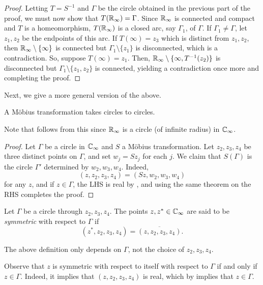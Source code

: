 \begin{proof}
		Letting $T = S^{-1}$ and $\Gamma$ be the circle obtained in the previous part of the proof, we must now show that $T(\mathbb{R}_\infty) = \Gamma$. Since $\mathbb{R}_\infty$ is connected and compact and $T$ is a homeomorphism, $T(\mathbb{R}_\infty)$ is a closed arc, say $\Gamma_1$, of $\Gamma$. If $\Gamma_1 \ne \Gamma$, let $z_1,z_2$ be the endpoints of this arc. If $T(\infty) = z_3$ which is distinct from $z_1,z_2$, then $\mathbb{R}_\infty \setminus \{\infty\}$ is connected but $\Gamma_1 \setminus \{z_1\}$ is disconnected, which is a contradiction. So, suppose $T(\infty) = z_1$. Then, $\mathbb{R}_\infty \setminus \{\infty,T^{-1}(z_2)\}$ is disconnected but $\Gamma_1 \setminus \{z_1,z_2\}$ is connected, yielding a contradiction once more and completing the proof.
	\end{proof}

	Next, we give a more general version of the above.
	
	\begin{ftheo}
		A M\"{o}bius transformation takes circles to circles.
	\end{ftheo}

	Note that  follows from this since $\mathbb{R}_\infty$ is a circle (of infinite radius) in $\mathbb{C}_\infty$.

	\begin{proof}
		Let $\Gamma$ be a circle in $\mathbb{C}_\infty$ and $S$ a M\"{o}bius transformation. Let $z_2,z_3,z_4$ be three distinct points on $\Gamma$, and set $w_j = Sz_j$ for each $j$. We claim that $S(\Gamma)$ is the circle $\Gamma'$ determined by $w_2,w_3,w_4$. Indeed,
		\[ (z,z_2,z_3,z_4) = (Sz,w_2,w_3,w_4) \]
		for any $z$, and if $z \in \Gamma$, the LHS is real by , and using the same theorem on the RHS completes the proof.
	\end{proof}

	\begin{fdef}
		Let $\Gamma$ be a circle through $z_2,z_3,z_4$. The points $z,z^* \in \mathbb{C}_\infty$ are said to be \emph{symmetric} with respect to $\Gamma$ if
		\[ (z^*,z_2,z_3,z_4) = \overline{(z,z_2,z_3,z_4)}. \]
	\end{fdef}

	\begin{remark}
		The above definition only depends on $\Gamma$, not the choice of $z_2,z_3,z_4$.
	\end{remark}

	Observe that $z$ is symmetric with respect to itself with respect to $\Gamma$ if and only if $z \in \Gamma$. Indeed, it implies that $(z,z_2,z_3,z_4)$ is real, which by  implies that $z \in \Gamma$.\\
	

